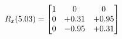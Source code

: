 \documentclass[preview]{standalone}
\begin{document}
\begin{align*}
\special{dvisvgm:raw <g id='unique000'>}R_{x}(5.03) = \begin{bmatrix}1 & 0 & 0 \\0 & +0.31 & +0.95 \\0 & -0.95 & +0.31\end{bmatrix}\special{dvisvgm:raw </g>}
\end{align*}
\end{document}
